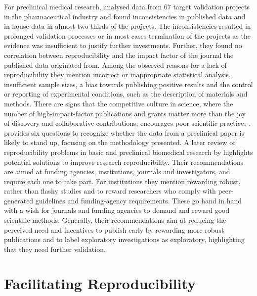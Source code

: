 For preclinical medical research, \cite{prinz2011believe} analysed data from 67 target validation projects in the pharmaceutical industry and found inconsistencies in published data and in-house data in almost two-thirds of the projects. The inconsistencies resulted in prolonged validation processes or in most cases termination of the projects as the evidence was insufficient to justify further investments. Further, they found no correlation between reproducibility and the impact factor of the journal the published data originated from. Among the observed reasons for a lack of reproducibility they mention incorrect or inappropriate statistical analysis, insufficient sample sizes, a bias towards publishing positive results and the control or reporting of experimental conditions, such as the description of materials and methods. There are signs that the competitive culture in science, where the number of high-impact-factor publications and grants matter more than the joy of discovery and collaborative contributions, encourages poor scientific practices \citep{Casadevall_2011}. \cite{Begley_2013} provides six questions to recognize whether the data from a preclinical paper is likely to stand up, focusing on the methodology presented. A later review of reproducibility problems in basic and preclinical biomedical research by \cite{begley2015reproducibility} highlights potential solutions to improve research reproducibility. Their recommendations are aimed at funding agencies, institutions, journals and investigators, and require each one to take part. For institutions they mention rewarding robust, rather than flashy studies and to reward researchers who comply with peer-generated guidelines and funding-agency requirements. These go hand in hand with a wish for journals and funding agencies to demand and reward good scientific methods. Generally, their recommendations aim at reducing the perceived need and incentives to publish early by rewarding more robust publications and to label exploratory investigations as exploratory, highlighting that they need further validation.

\section{Facilitating Reproducibility} \label{sec:improvements}

